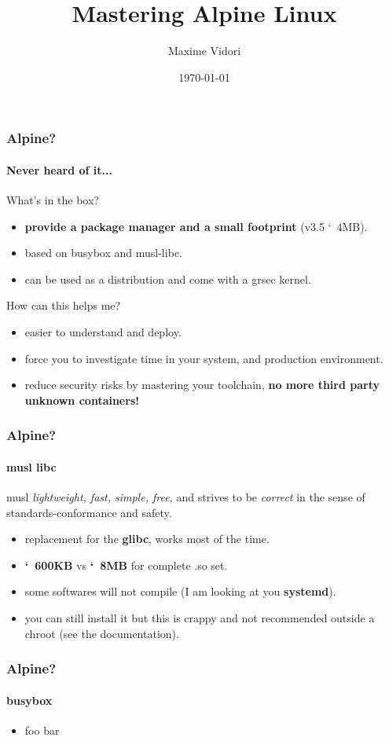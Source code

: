 \documentclass{beamer}
\title{Mastering Alpine Linux}
\date{\today}
\author{Maxime Vidori}
\begin{document}
\begin{frame}
  \titlepage
\end{frame}


\begin{frame}
  \frametitle{Alpine?}
  \framesubtitle{Never heard of it...}
  What's in the box?
  \begin{itemize}
    \item \textbf{provide a package manager and a small footprint} (v3.5 \char`~4MB).
    \item based on busybox and musl-libc.
    \item can be used as a distribution and come with a grsec kernel.
  \end{itemize}
  How can this helps me?
  \begin{itemize}
    \item easier to understand and deploy.
    \item force you to investigate time in your system, and production
      environment.
    \item reduce security risks by mastering your toolchain,
      \textbf{no more third party unknown containers!}
  \end{itemize}
\end{frame}

\begin{frame}
  \frametitle{Alpine?}
  \framesubtitle{musl libc}
  \begin{exampleblock}{musl}
    \vskip2mm
    \textit{lightweight, fast, simple, free,} and strives to be
    \textit{correct} in the sense of standards-conformance and safety.
    \vskip2mm
    \end{exampleblock}
  \begin{itemize}
    \item replacement for the \textbf{glibc}, works most of the time.
    \item \textbf{\char`~600KB} vs \textbf{\char`~8MB} for complete .so set.
    \item some softwares will not compile (I am looking at you \textbf{systemd}).
    \item you can still install it but this is crappy and not
      recommended outside a chroot (see the documentation).
  \end{itemize}
\end{frame}

\begin{frame}
  \frametitle{Alpine?}
  \framesubtitle{busybox}
  \begin{itemize}
    \item foo bar
  \end{itemize}
\end{frame}
\end{document}
